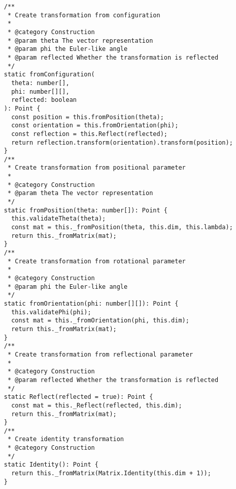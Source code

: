 \documentclass[../main.tex]{subfiles}
\begin{document}
\begin{verbatim}
     /**
      * Create transformation from configuration
      *
      * @category Construction
      * @param theta The vector representation
      * @param phi the Euler-like angle
      * @param reflected Whether the transformation is reflected
      */
     static fromConfiguration(
       theta: number[],
       phi: number[][],
       reflected: boolean
     ): Point {
       const position = this.fromPosition(theta);
       const orientation = this.fromOrientation(phi);
       const reflection = this.Reflect(reflected);
       return reflection.transform(orientation).transform(position);
     }
     /**
      * Create transformation from positional parameter
      *
      * @category Construction
      * @param theta The vector representation
      */
     static fromPosition(theta: number[]): Point {
       this.validateTheta(theta);
       const mat = this._fromPosition(theta, this.dim, this.lambda);
       return this._fromMatrix(mat);
     }
     /**
      * Create transformation from rotational parameter
      *
      * @category Construction
      * @param phi the Euler-like angle
      */
     static fromOrientation(phi: number[][]): Point {
       this.validatePhi(phi);
       const mat = this._fromOrientation(phi, this.dim);
       return this._fromMatrix(mat);
     }
     /**
      * Create transformation from reflectional parameter
      *
      * @category Construction
      * @param reflected Whether the transformation is reflected
      */
     static Reflect(reflected = true): Point {
       const mat = this._Reflect(reflected, this.dim);
       return this._fromMatrix(mat);
     }
     /**
      * Create identity transformation
      * @category Construction
      */
     static Identity(): Point {
       return this._fromMatrix(Matrix.Identity(this.dim + 1));
     }
   

\end{verbatim}
\end{document}
